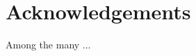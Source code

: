 \documentclass{cygsbornik}
\begin{document}
\section{Acknowledgements}      %
Among the many ...


%
%
%
%




% 
% 
\end{document}
